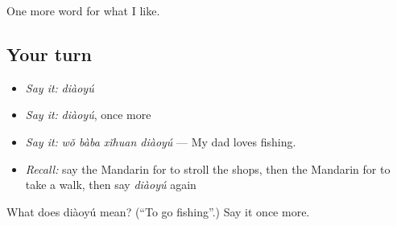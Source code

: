 \begin{grammarlens}[title={What you've built}]
One more word for what I like.
\end{grammarlens}

\subsection*{Your turn}
\begin{itemize}
\raggedright
  \item \emph{Say it:} \emph{diàoyú}
  \item \emph{Say it:} \emph{diàoyú}, once more
  \item \emph{Say it:} \emph{wǒ bàba xǐhuan diàoyú} — My dad loves fishing.
  \item \emph{Recall:} say the Mandarin for to stroll the shops, then the Mandarin for to take a walk, then say \emph{diàoyú} again
\end{itemize}

\begin{tcolorbox}[breakable,colback=teal!4,colframe=teal!35!black,title={Before you move on}]
What does diàoyú mean? (\textquotedblleft{}To go fishing\textquotedblright{}.) Say it once more.
\end{tcolorbox}
